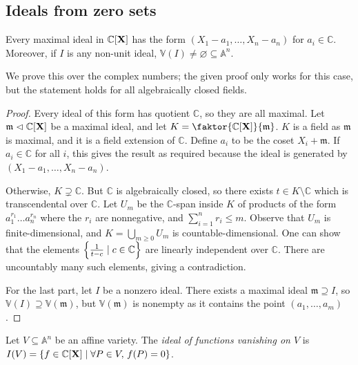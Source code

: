 \subsection{Ideals from zero sets}
\begin{theorem}
    Every maximal ideal in \( \mathbb C[\vb X] \) has the form \( (X_1 - a_1, \dots, X_n - a_n) \) for \( a_i \in \mathbb C \).
    Moreover, if \( I \) is any non-unit ideal, \( \mathbb V(I) \neq \varnothing \subseteq \mathbb A^n \).
\end{theorem}
We prove this over the complex numbers; the given proof only works for this case, but the statement holds for all algebraically closed fields.
\begin{proof}
    Every ideal of this form has quotient \( \mathbb C \), so they are all maximal.
    Let \( \mathfrak m \vartriangleleft \mathbb C[\vb X] \) be a maximal ideal, and let \( K = \faktor{\mathbb C[\vb X]}{\mathfrak m} \).
    \( K \) is a field as \( \mathfrak m \) is maximal, and it is a field extension of \( \mathbb C \).
    Define \( a_i \) to be the coset \( X_i + \mathfrak m \).
    If \( a_i \in \mathbb C \) for all \( i \), this gives the result as required because the ideal is generated by \( (X_1 - a_1, \dots, X_n - a_n) \).

    Otherwise, \( K \supsetneq \mathbb C \).
    But \( \mathbb C \) is algebraically closed, so there exists \( t \in K \setminus \mathbb C \) which is transcendental over \( \mathbb C \).
    Let \( U_m \) be the \( \mathbb C \)-span inside \( K \) of products of the form \( a_1^{r_1} \dots a_n^{r_n} \) where the \( r_i \) are nonnegative, and \( \sum_{i=1}^n r_i \leq m \).
    Observe that \( U_m \) is finite-dimensional, and \( K = \bigcup_{m \geq 0} U_m \) is countable-dimensional.
    One can show that the elements \( \qty{\frac{1}{t - c} \mid c \in \mathbb C} \) are linearly independent over \( \mathbb C \).
    There are uncountably many such elements, giving a contradiction.

    For the last part, let \( I \) be a nonzero ideal.
    There exists a maximal ideal \( \mathfrak m \supseteq I \), so \( \mathbb V(I) \supseteq \mathbb V(\mathfrak m) \), but \( \mathbb V(\mathfrak m) \) is nonempty as it contains the point \( (a_1, \dots, a_m) \).
\end{proof}
\begin{definition}
    Let \( V \subseteq \mathbb A^n \) be an affine variety.
    The \emph{ideal of functions vanishing on \( V \)} is \( I(V) = \qty{f \in \mathbb C[\vb X] \mid \forall P \in V,\, f(P) = 0} \).
\end{definition}

